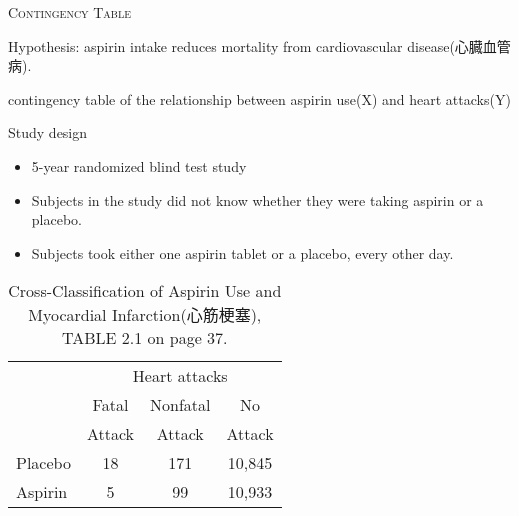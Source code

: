 \documentclass[dvipdfmx, serif,handout]{beamer}
\begin{document}
\begin{frame}{\textsc{Contingency Table}}

	\bi
	\item Hypothesis: aspirin intake reduces mortality from cardiovascular disease(心臓血管病).
	\item  contingency table of the relationship between aspirin use(X) and heart attacks(Y)
	\item Study design
	\begin{itemize}
		\item 5-year randomized blind test study
		\item Subjects in the study did not know whether they were taking aspirin or a placebo.
		\item Subjects took either one aspirin tablet or a placebo, every other day.
	\end{itemize}
	{\scriptsize
	\begin{table}
		\renewcommand{\arraystretch}{1.0}
		\begin{tabular}{lccc}                                                          \\ \hline
			        & \multicolumn{3}{c}{Heart attacks}                     \\ \cline{2-4}
			        & Fatal                             & Nonfatal & No     \\
			        & Attack                            & Attack   & Attack \\ \hline
			Placebo & 18                                & 171      & 10,845 \\
			Aspirin & 5                                 & 99       & 10,933 \\ \hline
		\end{tabular}
		\caption{\scriptsize Cross-Classification of Aspirin Use and Myocardial Infarction(心筋梗塞), TABLE 2.1 on page 37.}
	\end{table}
	}
	\ei

\end{frame}
\end{document}

